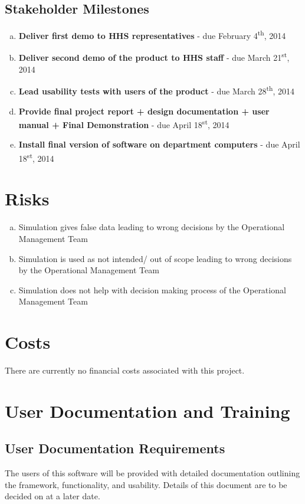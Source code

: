 \documentclass[paper=letter, fontsize=10pt]{scrartcl}
\numberwithin{equation}{section}		%
\numberwithin{figure}{section}			%
\numberwithin{table}{section}				%
\newcommand{\ts}{\textsuperscript}
\begin{document}
\subsection{Stakeholder Milestones}
\begin{enumerate}[(a)]	
	\item \textbf{Deliver first demo to HHS representatives} - due February 4\ts{th}, 2014
	\item \textbf{Deliver second demo of the product to HHS staff} - due March 21\ts{st}, 2014
	\item \textbf{Lead usability tests with users of the product} - due March 28\ts{th}, 2014
	\item \textbf{Provide final project report + design documentation + user manual + Final Demonstration} - due April 18\ts{st}, 2014
	\item \textbf{Install final version of software on department computers} - due April 18\ts{st}, 2014
\end{enumerate}
\section{Risks}
\begin{enumerate}[(a)]
	\item Simulation gives false data leading to wrong decisions by the Operational Management Team
	\item Simulation is used as not intended/ out of scope leading to wrong decisions by the Operational Management Team
	\item Simulation does not help with decision making process of the Operational Management Team 
\end{enumerate}
\section{Costs}
There are currently no financial costs associated with this project.

\section{User Documentation and Training}
\subsection{User Documentation Requirements}
The users of this software will be provided with detailed documentation outlining the framework, functionality, and usability. Details of this document are to be decided on at a later date.
\end{document}
